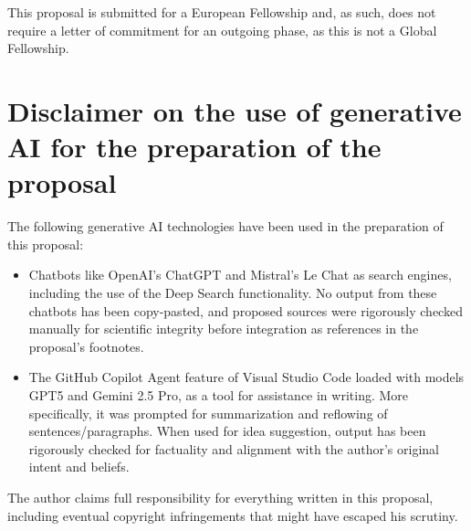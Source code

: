 \documentclass[11pt,draftproposal]{msca-pf}
\begin{document}
This proposal is submitted for a European Fellowship and, as such, does not require a letter of
commitment for an outgoing phase, as this is not a Global Fellowship.

\section{
    Disclaimer on the use of generative AI for the preparation of the proposal
}

The following generative AI technologies have been used in the preparation of this proposal:

\begin{itemize}
\item Chatbots like OpenAI's ChatGPT and Mistral's Le Chat as search engines, including the use of the Deep Search functionality. No output from these chatbots has been copy-pasted, and proposed sources were rigorously checked manually for scientific integrity before integration as references in the proposal's footnotes.
\item The GitHub Copilot Agent feature of Visual Studio Code loaded with models GPT5 and Gemini 2.5 Pro,
  as a tool for assistance in writing. More specifically, it was prompted for summarization and
  reflowing of sentences/paragraphs. When used for idea suggestion, output has been rigorously
  checked for factuality and alignment with the author's original intent and beliefs.
\end{itemize}

The author claims full responsibility for everything written in this proposal, including
eventual copyright infringements that might have escaped his scrutiny.
\end{document}
